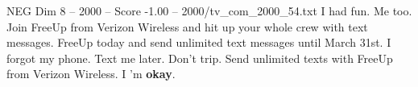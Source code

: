 \begin{textsample}{NEG Dim 8 – 2000 – Score -1.00 – 2000/tv\_com\_2000\_54.txt}  \label{ex:f8_neg_069}
I had fun.
Me too.
Join FreeUp from Verizon Wireless and hit up your whole crew with text messages.
FreeUp today and send unlimited text messages until March 31st.
I forgot my phone.
Text me later.
Don't trip.
Send unlimited texts with FreeUp from Verizon Wireless.
I 'm \textbf{okay}.

\end{textsample}
